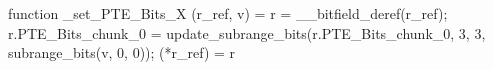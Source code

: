 function _set_PTE_Bits_X (r_ref, v) = {
    r = __bitfield_deref(r_ref);
    r.PTE_Bits_chunk_0 = update_subrange_bits(r.PTE_Bits_chunk_0, 3, 3, subrange_bits(v, 0, 0));
    (*r_ref) = r
}
